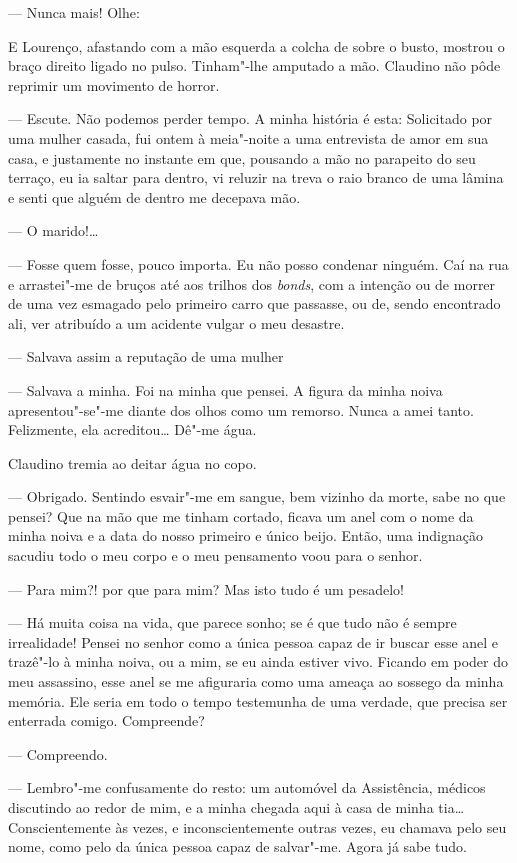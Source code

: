 --- Nunca mais! Olhe:

E Lourenço, afastando com a mão esquerda a colcha de sobre o busto,
mostrou o braço direito ligado no pulso. Tinham"-lhe amputado a mão.
Claudino não pôde reprimir um movimento de horror.

--- Escute. Não podemos perder tempo. A minha história é esta:
Solicitado por uma mulher casada, fui ontem à meia"-noite a uma
entrevista de amor em sua casa, e justamente no instante em que,
pousando a mão no parapeito do seu terraço, eu ia saltar para dentro, vi
reluzir na treva o raio branco de uma lâmina e senti que alguém de
dentro me decepava mão.

--- O marido!\ldots{}

--- Fosse quem fosse, pouco importa. Eu não posso condenar ninguém. Caí
na rua e arrastei"-me de bruços até aos trilhos dos \emph{bonds}, com a
intenção ou de morrer de uma vez esmagado pelo primeiro carro que
passasse, ou de, sendo encontrado ali, ver atribuído a um acidente
vulgar o meu desastre.

--- Salvava assim a reputação de uma mulher

--- Salvava a minha. Foi na minha que pensei. A figura da minha noiva
apresentou"-se"-me diante dos olhos como um remorso. Nunca a amei tanto.
Felizmente, ela acreditou\ldots{} Dê"-me água.

Claudino tremia ao deitar água no copo.

--- Obrigado. Sentindo esvair"-me em sangue, bem vizinho da morte, sabe
no que pensei? Que na mão que me tinham cortado, ficava um anel com o
nome da minha noiva e a data do nosso primeiro e único beijo. Então, uma
indignação sacudiu todo o meu corpo e o meu pensamento voou para o
senhor.

--- Para mim?! por que para mim? Mas isto tudo é um pesadelo!

--- Há muita coisa na vida, que parece sonho; se é que tudo não é sempre
irrealidade! Pensei no senhor como a única pessoa capaz de ir buscar
esse anel e trazê"-lo à minha noiva, ou a mim, se eu ainda estiver vivo.
Ficando em poder do meu assassino, esse anel se me afiguraria como uma
ameaça ao sossego da minha memória. Ele seria em todo o tempo testemunha
de uma verdade, que precisa ser enterrada comigo. Compreende?

--- Compreendo.

--- Lembro"-me confusamente do resto: um automóvel da Assistência,
médicos discutindo ao redor de mim, e a minha chegada aqui à casa de
minha tia\ldots{} Conscientemente às vezes, e inconscientemente outras vezes,
eu chamava pelo seu nome, como pelo da única pessoa capaz de salvar"-me.
Agora já sabe tudo.

